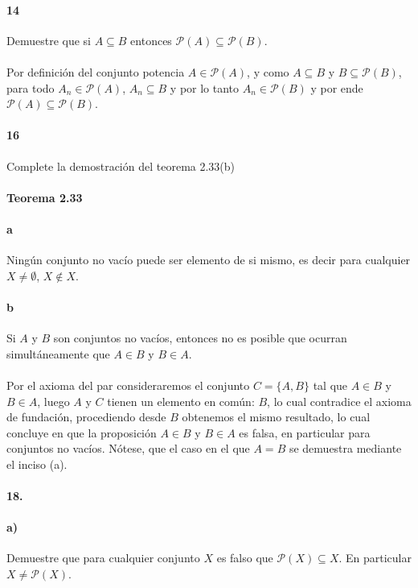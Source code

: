 \documentclass{article}
\begin{document}
	\paragraph{14} Demuestre que si $A \subseteq B$ entonces $\mathcal{P}(A) \subseteq \mathcal{P}(B)$.
	\paragraph{} Por definición del conjunto potencia $A \in \mathcal{P}(A)$, y como $A \subseteq B$ y $B \subseteq \mathcal{P}(B)$, para todo $A_n \in \mathcal{P}(A)$, $A_n \subseteq B$ y por lo tanto $A_n \in \mathcal{P}(B)$ y por ende $\mathcal{P}(A) \subseteq \mathcal{P}(B)$.
	\paragraph{16} Complete la demostración del teorema 2.33(b)
	\paragraph{Teorema 2.33}
	\paragraph{a}Ningún conjunto no vacío puede ser elemento de si mismo, es decir para cualquier $X \neq \emptyset$, $X \notin X$.
	\paragraph{b} Si $A$ y $B$ son conjuntos no vacíos, entonces no es posible que ocurran simultáneamente que $A \in B$ y $B \in A$.
	\paragraph{} Por el axioma del par consideraremos el conjunto $C = \{A, B\}$ tal que $A \in B$ y $B \in A$, luego $A$ y $C$ tienen un elemento en común: $B$, lo cual contradice el axioma de fundación, procediendo desde $B$ obtenemos el mismo resultado, lo cual concluye en que la proposición $A \in B$ y $B \in A$ es falsa, en particular para conjuntos no vacíos. Nótese, que el caso en el que $A = B$ se demuestra mediante el inciso (a).
	\paragraph{18.}
	
	\paragraph{a)} Demuestre que para cualquier conjunto $X$ es falso que $\mathcal{P}(X) \subseteq X$. En particular $X \neq \mathcal{P}(X)$.
\end{document}
